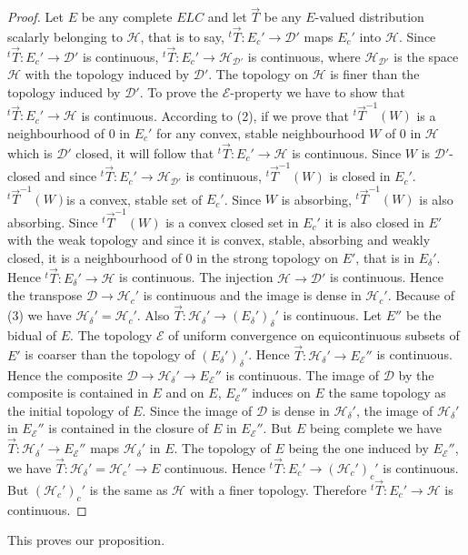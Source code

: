 \begin{proof}
Let $E$ be any complete $ELC$ and let $\overrightarrow{T}$ be any $E$-valued
distribution scalarly belonging to $\mathscr{H}$, that is to say,
${}^t\overrightarrow{T}: E_c' \rightarrow \mathscr{D}'$ maps $E_c'$
into $\mathscr{H}$. Since ${}^t\overrightarrow{T}: E_c' \rightarrow
\mathscr{D}'$ is continuous, ${}^t\overrightarrow{T}: E_c' \rightarrow
\mathscr{H}_\mathscr{D'}$ is continuous, where
$\mathscr{H}_\mathscr{D'}$ is the space $\mathscr{H}$ with the
topology induced by $\mathscr{D}'$. The topology on $\mathscr{H}$ is
finer than the topology induced by $\mathscr{D}'$. To prove the
$\mathcal{E}$-property we have to show that
${}^t\overrightarrow{T}:E_c' \rightarrow \mathscr{H}$ is
continuous. According to (2), if we prove that
${}^t{\overrightarrow{T}}^{-1} (W)$ is a neighbourhood of $0$ in $E_c'$
for any convex, stable neighbourhood $W$ of $0$ in $\mathscr{H}$ which
is $\mathscr{D}'$ closed, it will follow that ${}^t\overrightarrow{T}:
E_c' \rightarrow \mathscr{H}$ is continuous. Since $W$ is
$\mathscr{D}'$-closed and since ${}^t\overrightarrow{T}: E_c'
\rightarrow \mathscr{H}_\mathscr{D'}$ is continuous,
${}^t{\overrightarrow{T}}^{-1} (W)$ is closed in
$E_c'$. ${}^t{\overrightarrow{T}}^{-1} (W)$\pageoriginale is a convex,
stable set of $E_c'$. Since $W$ is absorbing,
${}^t{\overrightarrow{T}}^{-1} (W)$ is also absorbing. Since
${}^t{\overrightarrow{T}}^{-1}(W)$ is a convex closed set in $E_c'$ it
is also closed in $E'$ with the weak topology and since it is convex,
stable, absorbing and weakly closed, it is a neighbourhood of $0$ in
the strong topology on $E'$, that is in $E_\delta'$. Hence
${}^t\overrightarrow{T}: E_\delta' \rightarrow \mathscr{H}$ is
continuous. The injection $\mathscr{H} \rightarrow \mathscr{D}'$ is
continuous. Hence the transpose $\mathscr{D} \rightarrow
\mathscr{H}_c'$ is continuous and the image is dense in
$\mathscr{H}_c'$. Because of (3) we have
$\mathscr{H}_\delta'=\mathscr{H}_c'$. Also
$\overrightarrow{T}:\mathscr{H}_\delta' \rightarrow
(E_\delta')_\delta'$ is continuous. Let $E''$ be the bidual of
$E$. The topology $\mathcal{E}$ of uniform convergence on
equicontinuous subsets of $E'$ is coarser than the topology of
$(E_\delta')_\delta'$. Hence $\overrightarrow{T}:\mathscr{H}_\delta'
\rightarrow E_\mathscr{E}''$ is continuous. Hence the composite
$\mathscr{D} \rightarrow \mathscr{H}_\delta' \rightarrow
E_\mathcal{E}''$ is continuous. The image of $\mathscr{D}$ by the
composite is contained in $E$ and on $E$, $E_\mathcal{E}''$ induces on
$E$ the same topology as the initial topology of $E$. Since the image
of $\mathscr{D}$ is dense in $\mathscr{H}_\delta'$, the image of
$\mathscr{H}_\delta'$ in $E_\mathcal{E}''$ is contained in the closure
of $E$ in $E_\mathcal{E}''$. But $E$ being complete we have
$\overrightarrow{T}: \mathscr{H}_\delta' \to E_\mathcal{E}''$ maps
$\mathscr{H}_\delta'$ in $E$. The topology of $E$ being the one induced
by $E_\mathcal{E}''$, we have
$\overrightarrow{T}:\mathscr{H}_\delta'=\mathscr{H}_c' \to E$
continuous. Hence ${}^t\overrightarrow{T}:E_c' \to
(\mathscr{H}_c')_c'$ is continuous. But $(\mathscr{H}_c')_c'$ is the
same as $\mathscr{H}$ with a finer topology. Therefore
${}^t\overrightarrow{T}: E_c' \to \mathscr{H}$ is continuous.   
\end{proof}

This proves our proposition.
